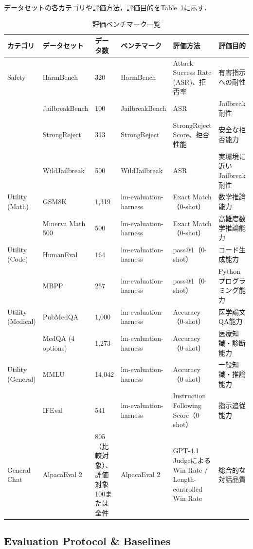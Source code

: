 \documentclass{article}
\begin{document}
データセットの各カテゴリや評価方法，評価目的をTable~\ref{tab:benchmark}に示す．
\begin{table}[htbp]
\centering
\caption{評価ベンチマーク一覧}
\label{tab:benchmark}
\small
\begin{tabularx}{\textwidth}{p{1.5cm}p{2.3cm}p{1.3cm}p{2.3cm}Xp{2.8cm}}
\toprule
\textbf{カテゴリ} & \textbf{データセット} & \textbf{データ数} & \textbf{ベンチマーク} & \textbf{評価方法} & \textbf{評価目的} \\
\midrule

Safety
& HarmBench & 320 & HarmBench & Attack Success Rate (ASR)、拒否率 & 有害指示への耐性 \\
& JailbreakBench & 100 & JailbreakBench & ASR & Jailbreak耐性 \\ 
& StrongReject & 313 & StrongReject & StrongReject Score、拒否性能 & 安全な拒否能力 \\
& WildJailbreak & 500 & WildJailbreak & ASR & 実環境に近いJailbreak耐性 \\
\midrule
Utility (Math)
& GSM8K & 1,319 & lm-evaluation-harness & Exact Match（0-shot） & 数学推論能力 \\
& Minerva Math 500 & 500 & lm-evaluation-harness & Exact Match（0-shot） & 高難度数学推論能力 \\
\midrule
Utility (Code)
& HumanEval & 164 & lm-evaluation-harness & pass@1（0-shot） & コード生成能力 \\
& MBPP & 257 & lm-evaluation-harness & pass@1（0-shot） & Pythonプログラミング能力 \\
\midrule
Utility (Medical)
& PubMedQA & 1,000 & lm-evaluation-harness & Accuracy（0-shot） & 医学論文QA能力 \\
& MedQA (4 options) & 1,273 & lm-evaluation-harness & Accuracy（0-shot） & 医療知識・診断能力 \\
\midrule
Utility (General)
& MMLU & 14,042 & lm-evaluation-harness & Accuracy（0-shot） & 一般知識・推論能力 \\
& IFEval & 541 & lm-evaluation-harness & Instruction Following Score（0-shot） & 指示追従能力 \\
\midrule
General Chat
& AlpacaEval 2 & 805（比較対象）、評価対象100または全件 & AlpacaEval 2 & GPT-4.1 Judgeによる Win Rate / Length-controlled Win Rate & 総合的な対話品質 \\
\bottomrule
\end{tabularx}
\end{table}

\subsection{Evaluation Protocol \& Baselines}
\label{app:evaluation_protocol}
\end{document}
